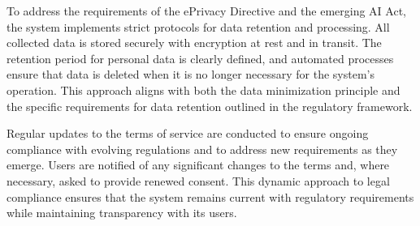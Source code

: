To address the requirements of the ePrivacy Directive and the emerging AI Act, the system implements strict protocols for data retention and processing. All collected data is stored securely with encryption at rest and in transit. The retention period for personal data is clearly defined, and automated processes ensure that data is deleted when it is no longer necessary for the system's operation. This approach aligns with both the data minimization principle and the specific requirements for data retention outlined in the regulatory framework.

Regular updates to the terms of service are conducted to ensure ongoing compliance with evolving regulations and to address new requirements as they emerge. Users are notified of any significant changes to the terms and, where necessary, asked to provide renewed consent. This dynamic approach to legal compliance ensures that the system remains current with regulatory requirements while maintaining transparency with its users.



